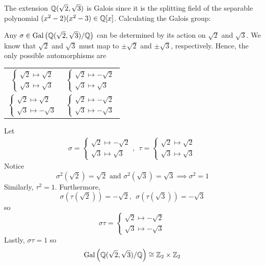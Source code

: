\begin{example}
    The extension $\mathbb{Q}(\sqrt{2}, \sqrt{3})$ is Galois since it is the splitting field of the separable polynomial $(x^2-2)(x^2-3) \in \mathbb{Q} [x]$. Calculating the Galois group:
    
    Any $\sigma \in \text{Gal}\left(\mathbb{Q}(\sqrt{2},\sqrt{3})/\mathbb{Q}\right)$ can be determined by its action on $\sqrt{2}$ and $\sqrt{3}$. We know that $\sqrt{2}$ and $\sqrt{3}$ must map to $\pm \sqrt{2}$ and $\pm \sqrt{3}$, respectively. Hence, the only possible automorphisms are
    \begin{center}
        \begin{tabular}{cc}
            $\begin{cases*}
                \sqrt{2} \mapsto \sqrt{2} \\
                \sqrt{3} \mapsto \sqrt{3}
            \end{cases*}$ & 
            $\begin{cases*}
                \sqrt{2} \mapsto -\sqrt{2} \\
                \sqrt{3} \mapsto \sqrt{3}
            \end{cases*}$ \\
            $\begin{cases*}
                \sqrt{2} \mapsto \sqrt{2} \\
                \sqrt{3} \mapsto -\sqrt{3}
            \end{cases*}$ &
            $\begin{cases*}
                \sqrt{2} \mapsto -\sqrt{2} \\
                \sqrt{3} \mapsto -\sqrt{3}
            \end{cases*}$
        \end{tabular}
    \end{center}
    Let
    \begin{align*}
        \sigma = 
        \begin{cases*}
            \sqrt{2} \mapsto -\sqrt{2} \\
            \sqrt{3} \mapsto \sqrt{3}
        \end{cases*}, ~~\tau = 
        \begin{cases*}
            \sqrt{2} \mapsto \sqrt{2} \\
            \sqrt{3} \mapsto \sqrt{3}
        \end{cases*}
    \end{align*}
    Notice
    $$\sigma^2(\sqrt{2}) = \sqrt{2} \text{ and } \sigma^2(\sqrt{3}) = \sqrt{3} \implies \sigma^2 = 1$$
    Similarly, $\tau^2 = 1$. Furthermore,
    $$\sigma(\tau(\sqrt{2})) = -\sqrt{2}, ~~\sigma(\tau(\sqrt{3}))=-\sqrt{3}$$
    so
    $$
    \sigma \tau = \begin{cases*}
        \sqrt{2} \mapsto -\sqrt{2} \\
        \sqrt{3} \mapsto -\sqrt{3}
    \end{cases*}
    $$
    Lastly, $\sigma \tau = 1$ so 
    $$\text{Gal}\left(\mathbb{Q}(\sqrt{2}, \sqrt{3})/\mathbb{Q}\right) \cong \mathbb{Z}_2 \times \mathbb{Z}_2$$
\end{example}

